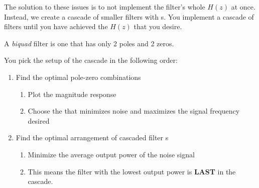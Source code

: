 The solution to these issues is to not implement the filter's whole $H(z)$ at once.
Instead, we create a cascade of smaller filters with s.
You implement a cascade of  filters until you have achieved the $H(z)$ that you desire.

\begin{definition}[Biquad]\label{def:Biquad}
  A \emph{biquad} filter is one that has only 2 poles and 2 zeros.
\end{definition}

You pick the setup of the cascade in the following order:
\begin{enumerate}[noitemsep]
\item Find the optimal pole-zero combinations
  \begin{enumerate}[noitemsep]
  \item Plot the magnitude response
  \item Choose the  that minimizes noise and maximizes the signal frequency desired
  \end{enumerate}
\item Find the optimal arrangement of cascaded filter s
  \begin{enumerate}[noitemsep]
  \item Minimize the average output power of the noise signal
  \item This means the filter with the lowest output power is \textbf{LAST} in the cascade.
  \end{enumerate}
\end{enumerate}

